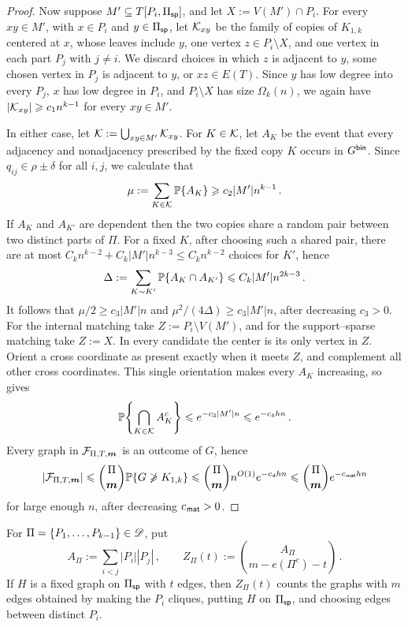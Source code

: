 \begin{proof}
Now suppose $M'\subseteq T[P_i,\Pi_{\mathsf{sp}}]$, and let $X:=V(M')\cap P_i$. For every $xy\in M'$, with $x\in P_i$ and $y\in\Pi_{\mathsf{sp}}$, let ${\mathcal K}_{xy}$ be the family of copies of $K_{1,k}$ centered at $x$, whose leaves include $y$, one vertex $z\in P_i\setminus X$, and one vertex in each part $P_j$ with $j\neq i$. We discard choices in which $z$ is adjacent to $y$, some chosen vertex in $P_j$ is adjacent to $y$, or $xz\in E(T)$. Since $y$ has low degree into every $P_j$, $x$ has low degree in $P_i$, and $P_i\setminus X$ has size $\Omega_k(n)$, we again have $|{\mathcal K}_{xy}|\geqslant c_1n^{k-1}$ for every $xy\in M'$.

In either case, let ${\mathcal K}:=\bigcup_{xy\in M'}{\mathcal K}_{xy}$. For $K\in{\mathcal K}$, let $A_K$ be the event that every adjacency and nonadjacency prescribed by the fixed copy $K$ occurs in $G^{\mathsf{bin}}$. Since $q_{ij}\in\rho\pm\delta$ for all $i,j$, we calculate that
$$\mu:=\sum_{K\in{\mathcal K}}{\mathbb P}\{A_K\}\geqslant c_2|M'|n^{k-1}\,.$$
If $A_K$ and $A_{K'}$ are dependent then the two copies share a random pair between two distinct parts of $\Pi$. For a fixed $K$, after choosing such a shared pair, there are at most $C_kn^{k-2}+C_k|M'|n^{k-3}\leq C_kn^{k-2}$ choices for $K'$, hence
$$\Delta:=\sum_{K\sim K'}{\mathbb P}\{A_K\cap A_{K'}\}\leqslant C_k|M'|n^{2k-3}\,.$$
It follows that $\mu/2\geq c_3|M'|n$ and $\mu^2/(4\Delta)\geq c_3|M'|n$, after decreasing $c_3>0$. For the internal matching take $Z:=P_i\setminus V(M')$, and for the support--sparse matching take $Z:=X$. In every candidate the center is its only vertex in $Z$. Orient a cross coordinate as present exactly when it meets $Z$, and complement all other cross coordinates. This single orientation makes every $A_K$ increasing, so  gives
$${\mathbb P}\!\left\{\bigcap_{K\in{\mathcal K}}A_K^c\right\}\leqslant e^{-c_3|M'|n}\leqslant e^{-c_4hn}\,.$$
Every graph in ${\mathcal F}_{\Pi,T,\boldsymbol{m}}$ is an outcome of $G$, hence
$$\lvert{\mathcal F}_{\Pi,T,\boldsymbol{m}}\rvert\leqslant \binom{\Pi}{\boldsymbol{m}}{\mathbb P}\{G\not\geqslant K_{1,k}\}\leqslant \binom{\Pi}{\boldsymbol{m}}n^{O(1)}e^{-c_4hn}\leqslant \binom{\Pi}{\boldsymbol{m}}e^{-c_{\hspace{0.2mm}\mathsf{mat}} hn}$$
for large enough $n$, after decreasing $c_{\hspace{0.2mm}\mathsf{mat}}>0$.
\end{proof}

For $\Pi=\{P_1,\dots,P_{k-1}\}\in{\mathscr D}$, put
$$A_\Pi:=\sum_{i<j}|P_i||P_j|\,,\qquad Z_\Pi(t):=\binom{A_\Pi}{m-e(\Pi^c)-t}\,.$$
If $H$ is a fixed graph on $\Pi_{\mathsf{sp}}$ with $t$ edges, then $Z_\Pi(t)$ counts the graphs with $m$ edges obtained by making the $P_i$ cliques, putting $H$ on $\Pi_{\mathsf{sp}}$, and choosing edges between distinct $P_i$.


